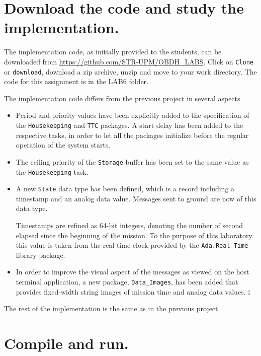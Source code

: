 \section{Download the code and study the implementation.}

The implementation code, as initially provided to the students, can be downloaded from \url{https://github.com/STR-UPM/OBDH\_LABS}. Click on {\tt Clone} or {\tt download}, download a zip archive, unzip and move to your work directory. The code for this assignment is in the LAB6 folder.

The implementation code differs from the previous project in several aspects.
\begin{itemize}
\item Period and priority values have been explicitly added to the specification of the {\tt Housekeeping} and {\tt TTC} packages. A start delay has been added to the respective tasks, in order to let all the packages initialize before the regular operation of the system starts.
\item The ceiling priority of the {\tt Storage} buffer has been set to the same value as the {\tt Housekeeping} task.
\item A new {\tt State} data type has been defined, which is a record including a timestamp and an analog data value. Messages sent to ground are now of this data type.

Timestamps are refined as 64-bit integers, denoting the number of second elapsed since the beginning of the mission. To the purpose of this laboratory this value is taken from the real-time clock provided by the {\tt Ada.Real\_Time} library package.
\item In order to improve the visual aspect of the messages as viewed on the host terminal application, a new package, {\tt Data\_Images}, has been added that provides fixed-width string images of mission time and analog data values.
i\end{itemize}

The rest of the implementation is the same as in the previous project.

\section{Compile and run.}

